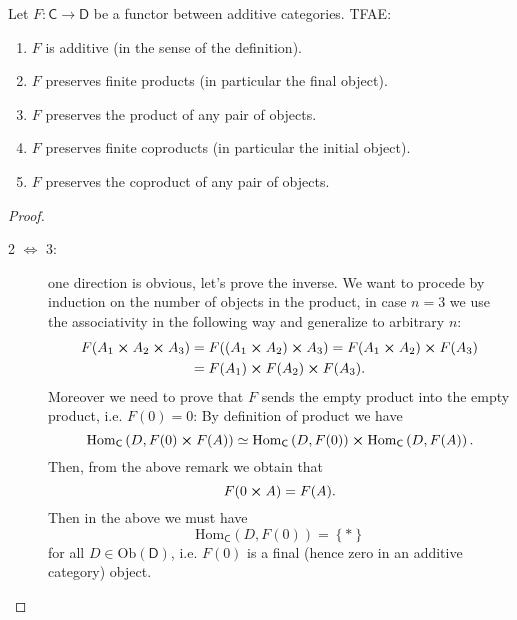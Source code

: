 \documentclass[../Main]{subfiles}
\begin{document}
\begin{lem}\label{lem:CharactAddFct}
	Let $F\colon \mathsf{C} \to \mathsf{D}$ be a functor between additive categories. TFAE:
	\begin{enumerate}
		\item $F$ is additive (in the sense of the definition).
		\item $F$ preserves finite products (in particular the final object).
		\item $F$ preserves the product of any pair of objects.
		\item $F$ preserves finite coproducts (in particular the initial object).
		\item $F$ preserves the coproduct of any pair of objects.
	\end{enumerate}
\end{lem} 
\begin{proof}\leavevmode\vspace{-.2\baselineskip}
	\begin{description}
		\item[2 $\iff$ 3:] one direction is obvious, let's prove the inverse.
			We want to procede by induction on the number of objects in
			the product, in case $n=3$ we use the associativity in the following way
			and generalize to arbitrary $n$:
				\begin{align}
					F(A_1 \cross A_2 \cross A_3) &=
					F((A_1 \cross A_2) \cross A_3) =
					F(A_1 \cross A_2) \cross F(A_3)\\
					&=
					F(A_1) \cross F(A_2) \cross F(A_3)
				.\end{align} 
				Moreover we need to prove that $F$ sends the empty product into
				the empty product, i.e. $F(0) = 0$:
				By definition of product we have
				\begin{equation}
					\mathrm{Hom}_{\mathsf{C}} \left( D, F(0) \cross F(A) \right)
					\simeq \mathrm{Hom}_{\mathsf{C}} \left( D, F(0) \right)
					\cross \mathrm{Hom}_{\mathsf{C}} \left( D, F(A) \right)
				.\end{equation} 
				Then, from the above remark we obtain that 
				\begin{equation}
					F(0 \cross A) = F(A)
				.\end{equation} 
				Then in the above we must have
				\begin{equation}
					\mathrm{Hom}_{\mathsf{C}} \left( D, F(0) \right) = \left\{ * \right\}
				\end{equation} 
				for all $D \in \mathrm{Ob} \left(\mathsf{D}\right)$,
				i.e. $F(0)$ is a final (hence zero in an additive category) object.


\end{description}
\end{proof}
\end{document}
